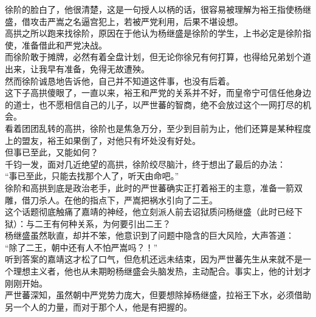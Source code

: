 \begin{multicols}{\theparacolNo}
徐阶的脸白了，他很清楚，这是一句授人以柄的话，很容易被理解为裕王指使杨继盛，借攻击严嵩之名逼宫犯上，若被严党利用，后果不堪设想。\\

高拱之所以跑来找徐阶，原因在于他认为杨继盛是徐阶的学生，上书必定是徐阶指使，准备借此和严党决战。\\

而徐阶敢于摊牌，必然有着全盘计划，但无论你徐兄有何打算，也得给兄弟划个道出来，让我早有准备，免得无故遭殃。\\

然而徐阶诚恳地告诉他，自己并不知道这件事，也没有后着。\\

这下子高拱傻眼了，一直以来，裕王和严党的关系并不好，而皇帝宁可信任他身边的道士，也不愿相信自己的儿子，以严世蕃的智商，绝不会放过这个一网打尽的机会。\\

看着团团乱转的高拱，徐阶也是焦急万分，至少到目前为止，他们还算是某种程度上的盟友，裕王如果倒了，对他只有坏处没有好处。\\

但事已至此，又能如何？\\

千钧一发，面对几近绝望的高拱，徐阶绞尽脑汁，终于想出了最后的办法：\\

“事已至此，只能去找那个人了，听天由命吧。”\\

徐阶和高拱到底是政治老手，此时的严世蕃确实正打着裕王的主意，准备一箭双雕，借刀杀人。在他的指点下，严嵩把祸水引向了二王。\\

这个话题彻底触痛了嘉靖的神经，他立刻派人前去诏狱质问杨继盛（此时已经下狱）：与二王有何种关系，为何要引出二王？\\

杨继盛虽然耿直，却并不笨，他意识到了问题中隐含的巨大风险，大声答道：\\

“除了二王，朝中还有人不怕严嵩吗？！”\\

听到答案的嘉靖这才松了口气，但危机还远未结束，因为严世蕃先生从来就不是一个理想主义者，他也从未期盼杨继盛会头脑发热，主动配合。事实上，他的计划才刚刚开始。\\

严世蕃深知，虽然朝中严党势力庞大，但要想除掉杨继盛，拉裕王下水，必须借助另一个人的力量，而对于那个人，他是有把握的。\\


\end{multicols}
